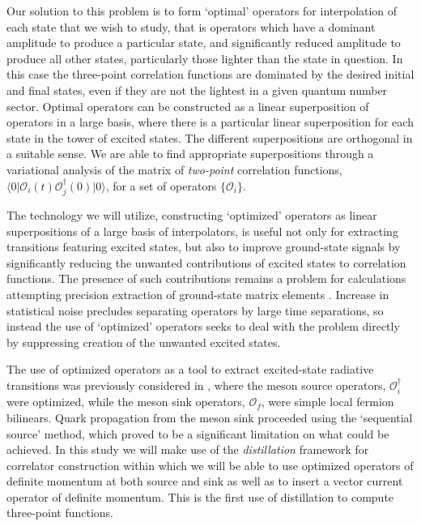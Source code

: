 \documentclass[twocolumn,amsmath,amssymb,prd,10pt,floatfix, 
superscriptaddress,nofootinbib, showpacs, preprintnumbers]{revtex4-1}
\begin{document}
Our solution to this problem is to form `optimal' operators for interpolation of each state that we wish to study, that is operators which have a dominant amplitude to produce a particular state, and significantly reduced amplitude to produce all other states, particularly those lighter than the state in question. In this case the three-point correlation functions are dominated by the desired initial and final states, even if they are not the lightest in a given quantum number sector. Optimal operators can be constructed as a linear superposition of operators in a large basis, where there is a particular linear superposition for each state in the tower of excited states. The different superpositions are orthogonal in a suitable sense. We are able to find appropriate superpositions through a variational analysis of the matrix of \emph{two-point} correlation functions, $\big\langle 0 \big| \mathcal{O}^{}_i(t) \mathcal{O}^\dag_j(0) \big| 0 \big\rangle$, for a set of operators $\{ \mathcal{O}_i \}$.


The technology we will utilize, constructing `optimized' operators as linear superpositions of a large basis of interpolators, is useful not only for extracting transitions featuring excited states, but also to improve ground-state signals by significantly reducing the unwanted contributions of excited states to correlation functions. The presence of such contributions remains a problem for calculations attempting precision extraction of ground-state matrix elements \cite{Aznauryan:2012ba,PhysRevD.83.045010,Horsley:2013ayv,PhysRevLett.96.052001,Lin:2012ev,Bali:2014gha,Dinter:2011sg,Green:2014xba}. Increase in statistical noise precludes separating operators by large time separations, so instead the use of `optimized' operators seeks to deal with the problem directly by suppressing creation of the unwanted excited states. 

The use of optimized operators as a tool to extract excited-state radiative transitions was previously considered in \cite{PhysRevD.79.094504}, where the meson source operators, $\mathcal{O}^\dag_{i}$ were optimized, while the meson sink operators, $\mathcal{O}_{f}$, were simple local fermion bilinears. Quark propagation from the meson sink proceeded using the `sequential source' method, which proved to be a significant limitation on what could be achieved. In this study we will make use of the \emph{distillation} framework for correlator construction \cite{Peardon:2009gh} within which we will be able to use optimized operators of definite momentum at both source and sink as well as to insert a vector current operator of definite momentum. This is the first use of distillation to compute three-point functions.
\end{document}
